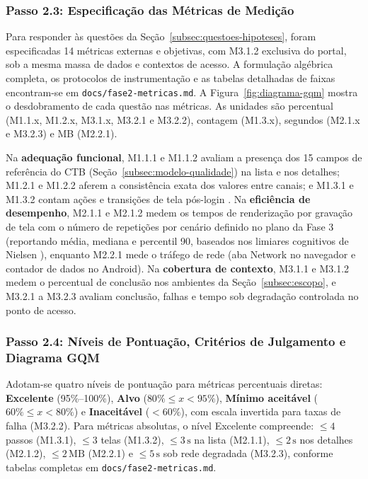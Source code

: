 \subsubsection{Passo 2.3: Especificação das Métricas de Medição}
\label{subsec:metricas-gqm}

Para responder às questões da Seção~\ref{subsec:questoes-hipoteses}, foram especificadas 14 métricas externas e objetivas, com M3.1.2 exclusiva do portal, sob a mesma massa de dados e contextos de acesso. A formulação algébrica completa, os protocolos de instrumentação e as tabelas detalhadas de faixas encontram-se em \texttt{docs/fase2-metricas.md}. A Figura~\ref{fig:diagrama-gqm} mostra o desdobramento de cada questão nas métricas. As unidades são percentual (M1.1.x, M1.2.x, M3.1.x, M3.2.1 e M3.2.2), contagem (M1.3.x), segundos (M2.1.x e M3.2.3) e MB (M2.2.1).


Na \textbf{adequação funcional}, M1.1.1 e M1.1.2 avaliam a presença dos 15 campos de referência do CTB (Seção~\ref{subsec:modelo-qualidade}) na lista e nos detalhes; M1.2.1 e M1.2.2 aferem a consistência exata dos valores entre canais; e M1.3.1 e M1.3.2 contam ações e transições de tela pós-login \cite{krug2014}. Na \textbf{eficiência de desempenho}, M2.1.1 e M2.1.2 medem os tempos de renderização por gravação de tela com o número de repetições por cenário definido no plano da Fase 3 (reportando média, mediana e percentil 90, baseados nos limiares cognitivos de Nielsen \cite{nielsen1994}), enquanto M2.2.1 mede o tráfego de rede (aba Network no navegador e contador de dados no Android). Na \textbf{cobertura de contexto}, M3.1.1 e M3.1.2 medem o percentual de conclusão nos ambientes da Seção~\ref{subsec:escopo}, e M3.2.1 a M3.2.3 avaliam conclusão, falhas e tempo sob degradação controlada no ponto de acesso.

\subsubsection{Passo 2.4: Níveis de Pontuação, Critérios de Julgamento e Diagrama GQM}
\label{subsec:niveis-pontuacao}
\label{subsec:criterios-julgamento}
\label{subsec:diagrama-gqm}

Adotam-se quatro níveis de pontuação para métricas percentuais diretas: \textbf{Excelente} (95\%--100\%), \textbf{Alvo} ($80\% \le x < 95\%$), \textbf{Mínimo aceitável} ($60\% \le x < 80\%$) e \textbf{Inaceitável} ($<60\%$), com escala invertida para taxas de falha (M3.2.2). Para métricas absolutas, o nível Excelente compreende: $\le 4$ passos (M1.3.1), $\le 3$ telas (M1.3.2), $\le 3\,\text{s}$ na lista (M2.1.1), $\le 2\,\text{s}$ nos detalhes (M2.1.2), $\le 2\,\text{MB}$ (M2.2.1) e $\le 5\,\text{s}$ sob rede degradada (M3.2.3), conforme tabelas completas em \texttt{docs/fase2-metricas.md}.

